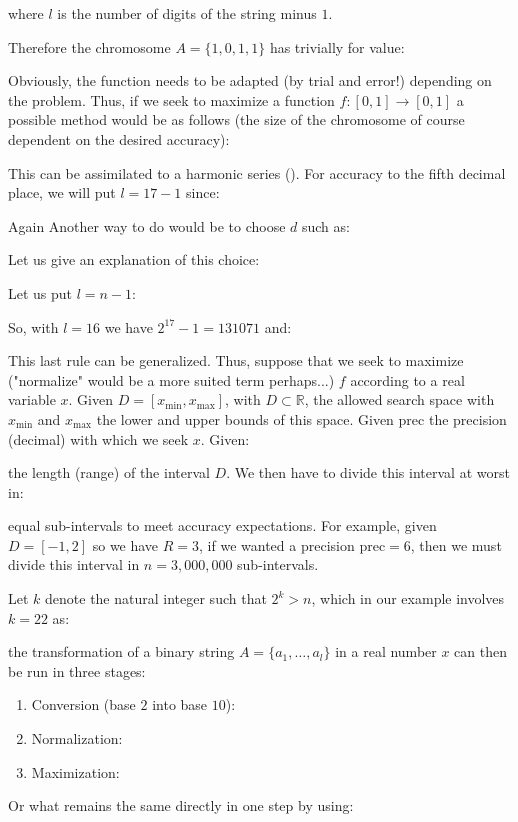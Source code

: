 	where $l$ is the number of digits of the string minus $1$.	
	
	Therefore the chromosome $A=\{1,0,1,1\}$ has trivially for value:
	
	Obviously, the function needs to be adapted (by trial and error!) depending on the problem. Thus, if we seek to maximize a function $f:[0,1]\rightarrow [0,1]$ a possible method would be as follows (the size of the chromosome of course dependent on the desired accuracy):
	
	
	This can be assimilated to a harmonic series (). For accuracy to the fifth decimal place, we will put $l=17-1$ since:
	
	Again Another way to do would be to choose $d$ such as:
	
	Let us give an explanation of this choice:
	
	Let us put $l=n-1$:
	
	So, with $l=16$ we have $2^{17}-1=131071$ and:
	
	This last rule can be generalized. Thus, suppose that we seek to maximize ("normalize" would be a more suited term perhaps...) $f$ according to a real variable $x$. Given $D=[x_{\min},x_{\max}]$, with $D\subset \mathbb{R}$, the allowed  search space with $x_{\min}$ and $x_{\max}$ the lower and upper bounds of this space. Given $\mathrm{prec}$ the precision (decimal) with which we seek $x$. Given:
	
	the length (range) of the interval $D$. We then have to divide this interval at worst in:
	
	equal sub-intervals to meet accuracy expectations. For example, given $D=[-1,2]$ so we have $R=3$, if we wanted a precision $\mathrm{prec}=6$, then we must divide this interval in $n=3,000,000$ sub-intervals.
	
	Let $k$ denote the natural integer such that $2^k>n$, which in our example involves $k=22$ as:
	
	the transformation of a binary string $A=\{a_1,\ldots,a_l\}$ in a real number $x$ can then be run in three stages:
	\begin{enumerate}
		\item Conversion (base $2$ into base $10$):
		

		\item Normalization:
		

		\item Maximization:
		
	\end{enumerate}
	Or what remains the same directly in one step by using:
	
